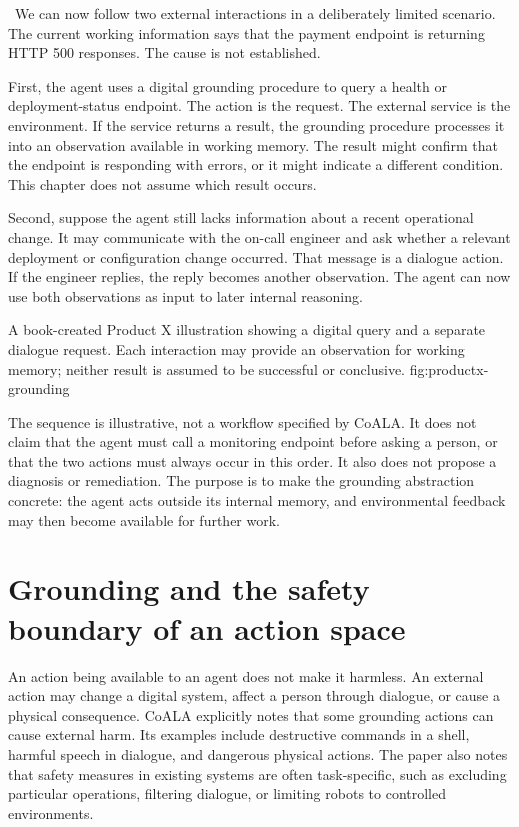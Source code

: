 \BookExampleLabel\ We can now follow two external interactions in a deliberately limited scenario. The current working information says that the payment endpoint is returning HTTP 500 responses. The cause is not established.

First, the agent uses a digital grounding procedure to query a health or deployment-status endpoint. The action is the request. The external service is the environment. If the service returns a result, the grounding procedure processes it into an observation available in working memory. The result might confirm that the endpoint is responding with errors, or it might indicate a different condition. This chapter does not assume which result occurs.

Second, suppose the agent still lacks information about a recent operational change. It may communicate with the on-call engineer and ask whether a relevant deployment or configuration change occurred. That message is a dialogue action. If the engineer replies, the reply becomes another observation. The agent can now use both observations as input to later internal reasoning.

  {A book-created Product X illustration showing a digital query and a separate dialogue request. Each interaction may provide an observation for working memory; neither result is assumed to be successful or conclusive.}
  {fig:productx-grounding}

The sequence is illustrative, not a workflow specified by CoALA. It does not claim that the agent must call a monitoring endpoint before asking a person, or that the two actions must always occur in this order. It also does not propose a diagnosis or remediation. The purpose is to make the grounding abstraction concrete: the agent acts outside its internal memory, and environmental feedback may then become available for further work.

\section{Grounding and the safety boundary of an action space}
\label{sec:grounding-safety}

An action being available to an agent does not make it harmless. An external action may change a digital system, affect a person through dialogue, or cause a physical consequence. CoALA explicitly notes that some grounding actions can cause external harm. Its examples include destructive commands in a shell, harmful speech in dialogue, and dangerous physical actions. The paper also notes that safety measures in existing systems are often task-specific, such as excluding particular operations, filtering dialogue, or limiting robots to controlled environments.

